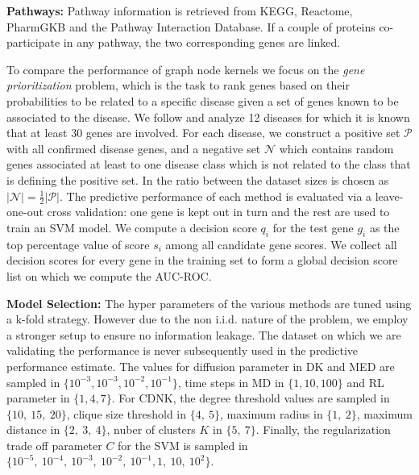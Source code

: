 \textbf{Pathways:} Pathway information is retrieved from KEGG, Reactome, PharmGKB and the Pathway Interaction Database. If a couple of proteins co-participate in any pathway, the two corresponding genes are linked.  

To compare the performance of graph node kernels we focus on the {\em gene prioritization} problem, which is the task to rank genes based on their probabilities to be related to a specific disease given a set of genes known to be associated to the disease. We follow \cite{chen2014disease} and analyze  12 diseases \cite{goh2007human} for which it is known that at least 30 genes are involved. For each disease, we construct a positive set $\mathcal{P}$ with all confirmed disease genes, and a negative set $\mathcal{N}$ which contains random genes associated at least to one disease class which is not related to the class that is defining the positive set. In \cite{chen2014disease} the ratio between the dataset sizes is chosen as $\vert \mathcal{N} \vert = \frac{1}{2} \vert \mathcal{P} \vert$. The predictive performance of each method is evaluated via a leave-one-out cross validation: one gene is kept out in turn and the rest are used to train an SVM model. We compute a decision score $q_i$ for the test gene $g_i$ as the top percentage value of score $s_i$ among all candidate gene scores. We collect all decision scores for every gene in the training set to form a global decision score list on which we compute the AUC-ROC.

\textbf{Model Selection:}
The hyper parameters of the various methods are tuned using a k-fold strategy. However due to the non i.i.d. nature of the problem, we employ a stronger setup to ensure no information leakage. The dataset on which we are validating the performance is never subsequently used in the predictive performance estimate. The values for diffusion parameter in DK and MED are sampled in $\lbrace 10^{-3}, 10^{-3}, 10^{-2}, 10^{-1} \rbrace$, time steps in MD in $\lbrace 1, 10, 100 \rbrace$ and RL parameter in $\lbrace 1, 4, 7 \rbrace$. For CDNK, the degree threshold values are sampled in $\lbrace 10,\ 15,\ 20 \rbrace$, clique size threshold in $\lbrace 4,\ 5 \rbrace$, maximum radius in $\lbrace 1,\ 2 \rbrace$, maximum distance in $\lbrace 2,\ 3,\ 4 \rbrace$, nuber of clusters $K$ in $\lbrace 5,\ 7 \rbrace$. Finally, the regularization trade off parameter $C$ for the SVM is sampled in $\lbrace 10^{-5},  \ 10^{-4}, \ 10^{-3},\ 10^{-2},\ 10^{-1}, 1,\ 10,\ 10^2 \rbrace$.

